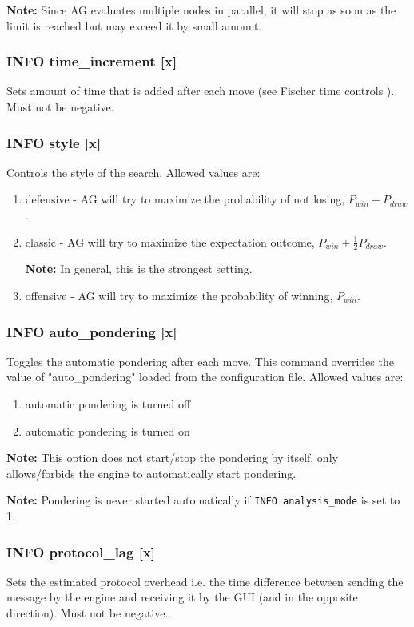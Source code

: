 \documentclass[12pt,a4paper]{article}
\begin{document}
\textbf{Note:} Since AG evaluates multiple nodes in parallel, it will stop as soon as the limit is reached but may exceed it by small amount.

\subsubsection{INFO time{\_}increment [x]}
Sets amount of time that is added after each move (see Fischer time controls \cite{fischer}). Must not be negative.

\subsubsection{INFO style [x]}
Controls the style of the search. Allowed values are:
\begin{enumerate}[leftmargin=7.5em]
	\item[\text{$[x]=0$}]{defensive - AG will try to maximize the probability of not losing, $P_{win} + P_{draw}$.}
	\item[\text{$[x]=1$}]{classic - AG will try to maximize the expectation outcome, $P_{win} + \frac{1}{2}P_{draw}$.
	
	\textbf{Note:} In general, this is the strongest setting.}
	\item[\text{$[x]=2$}]{offensive - AG will try to maximize the probability of winning, $P_{win}$.}
\end{enumerate}

\subsubsection{INFO auto{\_}pondering [x]}
Toggles the automatic pondering after each move. This command overrides the value of "auto{\_}pondering" loaded from the configuration file. Allowed values are:
\begin{enumerate}[leftmargin=7.5em]
	\item[\text{$[x]=0$}]{automatic pondering is turned off}
	\item[\text{$[x]=1$}]{automatic pondering is turned on}
\end{enumerate}

\textbf{Note:} This option does not start/stop the pondering by itself, only allows/forbids the engine to automatically start pondering.

\textbf{Note:} Pondering is never started automatically if \texttt{INFO analysis{\_}mode} is set to 1.

\subsubsection{INFO protocol{\_}lag [x]}
Sets the estimated protocol overhead i.e. the time difference between sending the message by the engine and receiving it by the GUI (and in the opposite direction). Must not be negative.
\end{document}

